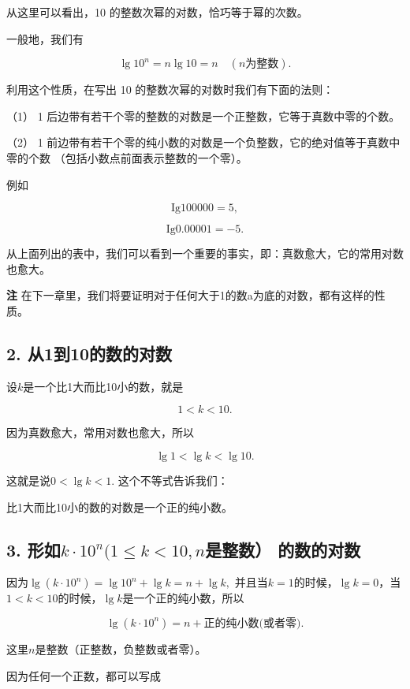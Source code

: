 从这里可以看出，10 的整数次幂的对数，恰巧等于幂的次数。

一般地，我们有

\[
\lg 10^{n} = n \lg 10 = n \quad (n \text{为整数}).
\]

利用这个性质，在写出 10 的整数次幂的对数时我们有下面的法则：

（1） 1 后边带有若干个零的整数的对数是一个正整数，它等于真数中零的个数。

（2） 1
前边带有若干个零的纯小数的对数是一个负整数，它的绝对值等于真数中零的个数
（包括小数点前面表示整数的一个零）。

例如

\[
\mathrm{Ig} 100000 = 5,
\]

\[
\mathrm{Ig} 0.00001 = - 5.
\]

从上面列出的表中，我们可以看到一个重要的事实，即：真数愈大，它的常用对数也愈大。

\textbf{注}
在下一章里，我们将要证明对于任何大于1的数a为底的对数，都有这样的性质。

\subsection{2. 从1到10的数的对数}

设\(k\)是一个比1大而比10小的数，就是

\[
1 < k < 10.
\]

因为真数愈大，常用对数也愈大，所以

\[
\lg 1 < \lg k < \lg 10.
\]

这就是说\(0 < \lg k < 1.\) 这个不等式告诉我们：

比1大而比10小的数的对数是一个正的纯小数。

\subsection{\texorpdfstring{3. 形如\(k \cdot 10^{n} (1 \leqslant k < 10, n\)是整数） 的数的对数}{3. 形如k \textbackslash cdot 10\^{}\{n\} (1 \textbackslash leqslant k \textless{} 10, n是整数） 的数的对数}}

因为\(\lg (k\cdot 10^{n}) = \lg 10^{n} + \lg k = n + \lg k,\)
并且当\(k = 1\)的时候，\(\lg k = 0\)，当\(1 < k < 10\)的时候，\(\lg k\)是一个正的纯小数，所以

\[
\lg (k \cdot 10^{n}) = n + \text{正的纯小数(或者零)}.
\]

这里\(n\)是整数（正整数，负整数或者零）。

因为任何一个正数，都可以写成

